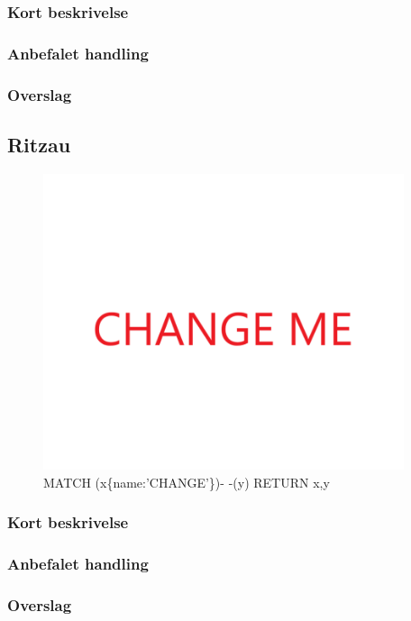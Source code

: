 \documentclass{article}
\begin{document}
\subsubsection{Kort beskrivelse}
\subsubsection{Anbefalet handling}
\subsubsection{Overslag}


\subsection{Ritzau}
\begin{figure}[h]
\includegraphics[width=300pt]{CHANGE.PNG}
\caption{MATCH (x\{name:'CHANGE'\})- -(y) RETURN x,y}
\end{figure}
\subsubsection{Kort beskrivelse}
\subsubsection{Anbefalet handling}
\subsubsection{Overslag}
\end{document}
